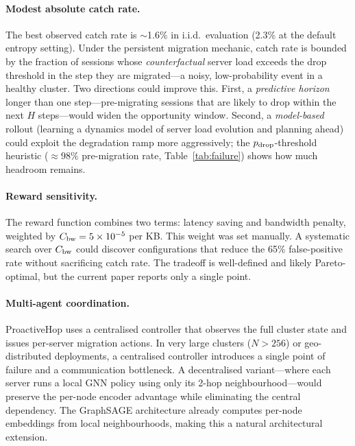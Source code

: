 \documentclass[review,1p]{elsarticle}
\theoremstyle{definition}
\begin{document}
\paragraph{Modest absolute catch rate.}
The best observed catch rate is $\sim$1.6\% in i.i.d.\ evaluation (2.3\% at the default entropy setting).
Under the persistent migration mechanic, catch rate is bounded by the fraction
of sessions whose \emph{counterfactual} server load exceeds the drop threshold
in the step they are migrated---a noisy, low-probability event in a healthy cluster.
Two directions could improve this.  First, a \emph{predictive
horizon} longer than one step---pre-migrating sessions that are
likely to drop within the next $H$ steps---would widen the opportunity
window.  Second, a \emph{model-based} rollout (learning a dynamics
model of server load evolution and planning ahead) could exploit the
degradation ramp more aggressively; the $p_{\rm drop}$-threshold heuristic
(${\approx}98\%$ pre-migration rate, Table~\ref{tab:failure}) shows how much headroom remains.

\paragraph{Reward sensitivity.}
The reward function combines two terms: latency saving and bandwidth
penalty, weighted by $C_{\rm bw} = 5\times10^{-5}$ per KB.  This weight
was set manually.  A systematic search over $C_{\rm bw}$ could discover
configurations that reduce the 65\% false-positive rate without
sacrificing catch rate.  The tradeoff is well-defined and likely
Pareto-optimal, but the current paper reports only a single point.

\paragraph{Multi-agent coordination.}
ProactiveHop uses a centralised controller that observes the full
cluster state and issues per-server migration actions.  In very large
clusters ($N > 256$) or geo-distributed deployments, a centralised
controller introduces a single point of failure and a communication
bottleneck.  A decentralised variant---where each server runs a local
GNN policy using only its 2-hop neighbourhood---would preserve the
per-node encoder advantage while eliminating the central dependency.
The GraphSAGE architecture already computes per-node embeddings from
local neighbourhoods, making this a natural architectural extension.
\end{document}
